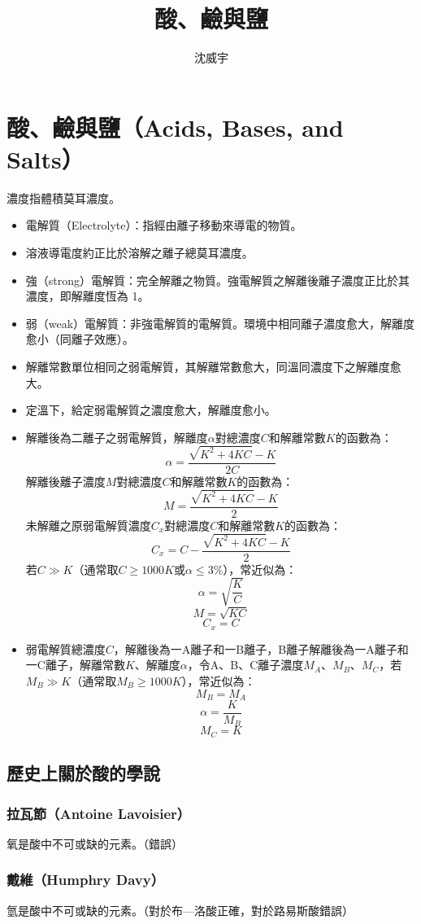 \documentclass[a4paper,12pt]{article}
\begin{document}
\title{酸、鹼與鹽}
\author{沈威宇}
\date{\temtoday}
\titletocdoc
\section{酸、鹼與鹽（Acids, Bases, and Salts）}
濃度指體積莫耳濃度。
\begin{itemize}
\item 電解質（Electrolyte）：指經由離子移動來導電的物質。
\item 溶液導電度約正比於溶解之離子總莫耳濃度。
\item 強（strong）電解質：完全解離之物質。強電解質之解離後離子濃度正比於其濃度，即解離度恆為 1。
\item 弱（weak）電解質：非強電解質的電解質。環境中相同離子濃度愈大，解離度愈小（同離子效應）。
\item 解離常數單位相同之弱電解質，其解離常數愈大，同溫同濃度下之解離度愈大。
\item 定溫下，給定弱電解質之濃度愈大，解離度愈小。
\item 解離後為二離子之弱電解質，解離度$\alpha$對總濃度$C$和解離常數$K$的函數為：
\[\alpha = \frac{\sqrt{K^2+4KC}-K}{2C}\]
解離後離子濃度$M$對總濃度$C$和解離常數$K$的函數為：
\[M = \frac{\sqrt{K^2+4KC}-K}{2}\]
未解離之原弱電解質濃度$C_x$對總濃度$C$和解離常數$K$的函數為：
\[C_x = C-\frac{\sqrt{K^2+4KC}-K}{2}\]
若$C\gg K$（通常取$C\geq 1000 K$或$\alpha\leq 3\%$），常近似為：
\[\alpha=\sqrt{\frac{K}{C}}\]
\[M=\sqrt{KC}\]
\[C_x=C\]
\item 弱電解質總濃度$C$，解離後為一A離子和一B離子，B離子解離後為一A離子和一C離子，解離常數$K$、解離度$\alpha$，令A、B、C離子濃度$M_A$、$M_B$、$M_C$，若$M_B\gg K$（通常取$M_B\geq 1000 K$），常近似為：
\[M_B=M_A\]
\[\alpha=\frac{K}{M_B}\]
\[M_C=K\]
\end{itemize}
\subsection{歷史上關於酸的學說}
\subsubsection{拉瓦節（Antoine Lavoisier）}
氧是酸中不可或缺的元素。（錯誤）
\subsubsection{戴維（Humphry Davy）}
氫是酸中不可或缺的元素。（對於布—洛酸正確，對於路易斯酸錯誤）
\end{document}
